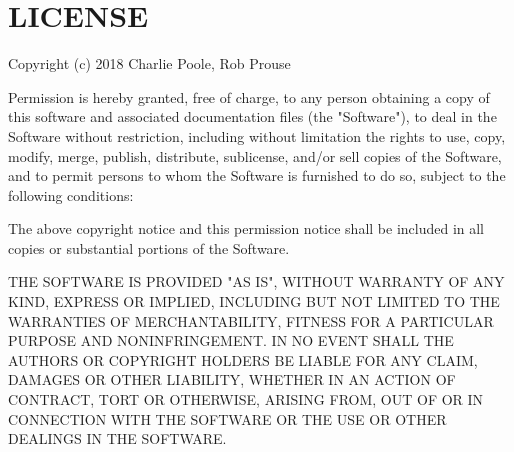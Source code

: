 \chapter{LICENSE}
\hypertarget{md__hey_tea_9_2_library_2_package_cache_2com_8unity_8ext_8nunit_0d1_80_86_2_l_i_c_e_n_s_e}{}\label{md__hey_tea_9_2_library_2_package_cache_2com_8unity_8ext_8nunit_0d1_80_86_2_l_i_c_e_n_s_e}
Copyright (c) 2018 Charlie Poole, Rob Prouse

Permission is hereby granted, free of charge, to any person obtaining a copy of this software and associated documentation files (the "{}\+Software"{}), to deal in the Software without restriction, including without limitation the rights to use, copy, modify, merge, publish, distribute, sublicense, and/or sell copies of the Software, and to permit persons to whom the Software is furnished to do so, subject to the following conditions\+:

The above copyright notice and this permission notice shall be included in all copies or substantial portions of the Software.

THE SOFTWARE IS PROVIDED "{}\+AS IS"{}, WITHOUT WARRANTY OF ANY KIND, EXPRESS OR IMPLIED, INCLUDING BUT NOT LIMITED TO THE WARRANTIES OF MERCHANTABILITY, FITNESS FOR A PARTICULAR PURPOSE AND NONINFRINGEMENT. IN NO EVENT SHALL THE AUTHORS OR COPYRIGHT HOLDERS BE LIABLE FOR ANY CLAIM, DAMAGES OR OTHER LIABILITY, WHETHER IN AN ACTION OF CONTRACT, TORT OR OTHERWISE, ARISING FROM, OUT OF OR IN CONNECTION WITH THE SOFTWARE OR THE USE OR OTHER DEALINGS IN THE SOFTWARE. 